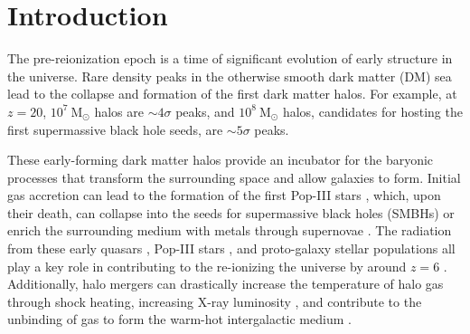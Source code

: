 
%
%

\section{Introduction}
\label{sec:introduction}







The pre-reionization epoch is a time of significant evolution of early structure in the universe.  Rare density peaks in the otherwise smooth dark matter (DM) sea lead to the collapse and formation of the first dark matter halos.  For example, at $z = 20$, $10^{7}~\mathrm{M}_{\odot}$ halos are $\sim 4\sigma$ peaks, and $10^{8}~\mathrm{M}_{\odot}$ halos, candidates for hosting the first supermassive black hole seeds, are $\sim 5\sigma$ peaks.

These early-forming dark matter halos provide an incubator for the baryonic processes that transform the surrounding space and allow galaxies to form.  Initial gas accretion can lead to the formation of the first Pop-III stars \citep{1986MNRAS.221...53C, 1997ApJ...474....1T, 2000ApJ...540...39A, 2002Sci...295...93A}, which, upon their death, can collapse into the seeds for supermassive black holes (SMBHs) \citep{2001ApJ...551L..27M, 2003MNRAS.340..647I, 2009ApJ...701L.133A, 2012ApJ...754...34J} or enrich the surrounding medium with metals through supernovae \citep{2002ApJ...567..532H, 2003ApJ...591..288H}.  The radiation from these early quasars \citep{1987ApJ...321L.107S, 1999ApJ...514..648M, 2001AJ....122.2833F}, Pop-III stars \citep{1997ApJ...486..581G, 2003ApJ...584..621V, 2006ApJ...639..621A}, and proto-galaxy stellar populations \citep{2012ApJ...752L...5B, 2012MNRAS.423..862K} all play a key role in contributing to the re-ionizing the universe by around $z = 6$ \citep{2001PhR...349..125B}.  Additionally, halo mergers can drastically increase the temperature of halo gas through shock heating, increasing X-ray luminosity \citep{2009MNRAS.397..190S}, and contribute to the unbinding of gas to form the warm-hot intergalactic medium \citep{2008SSRv..134..141B, 2010MNRAS.405L..31S, 2012MNRAS.425.2974T}.




